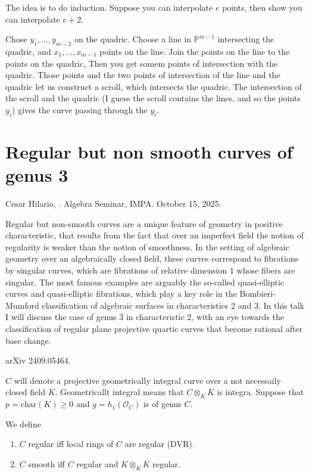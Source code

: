 \noindent
The idea is to do induction.
Suppose you can interpolate $e$ points,
then show you can interpolate $e+2$.

Chose $y_1,\ldots,y_{m-2}$ on the quadric.
Choose a line in $\mathbb{P}^{m-1}$ intersecting the quadric,
and $x_1,\ldots,x_{m-1}$ points on the line.
Join the points on the line to the points on the quadric,
Then you get somem points of intersection with the quadric.
Those points and the two points of intersection of the line and the quadric
let us construct a scroll, which intersects the quadric.
The intersection of the scroll and the quadric
(I guess the scroll contains the lines, and so the points $y_i$)
gives the curve passing through the $y_i$.

\section{Regular but non smooth curves of genus 3}
\label{section-regular-but-non-smooth}

\noindent
Cesar Hilario, .
Algebra Seminar, IMPA. 
October 15, 2025.

 Regular but non-smooth curves are a unique feature of
geometry in positive characteristic, that results from the fact that over an
imperfect field the notion of regularity is weaker than the notion of
smoothness. In the setting of algebraic geometry over an algebraically closed
field, these curves correspond to fibrations by singular curves, which are
fibrations of relative dimension 1 whose fibers are singular. The most famous
examples are arguably the so-called quasi-elliptic curves and quasi-elliptic
fibrations, which play a key role in the Bombieri-Mumford classification of
algebraic surfaces in characteristics 2 and 3. In this talk I will discuss the
case of genus 3 in characteristic 2, with an eye towards the classification of
regular plane projective quartic curves that become rational after base change.

\medskip\noindent
arXiv 2409.05464.

\medskip\noindent
$C$ will denote a projective geometrically integral curve over
a not necessaily closed field $K$. Geometricallt integral
means that $C \otimes_K \overline{K}$ is integra.
Suppose that $p=\text{char}(K) \geq 0$
and $g=h_1(\mathcal{O}_C)$ is of genus $C$.

We define
\begin{enumerate}
\item $C$ regular iff local rings of $C$ are regular (DVR).
\item $C$ smooth iff $C$ regular and $K \otimes_K \overline{K}$ regular.
\end{enumerate}

